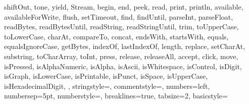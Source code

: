 {{		shiftOut, tone, yield, Stream, begin, end, peek, read, print, 
		println, available, availableForWrite, flush, setTimeout, find, 
		findUntil, parseInt, parseFloat, readBytes, readBytesUntil, readString, 
		readStringUntil, trim, toUpperCase, toLowerCase, charAt, compareTo, 
		concat, endsWith, startsWith, equals, equalsIgnoreCase, getBytes, 
		indexOf, lastIndexOf, length, replace, setCharAt, substring, 
		toCharArray, toInt, press, release, releaseAll, accept, click, move, 
		isPressed, isAlphaNumeric, isAlpha, isAscii, isWhitespace, isControl, 
		isDigit, isGraph, isLowerCase, isPrintable, isPunct, isSpace, 
		isUpperCase, isHexadecimalDigit, 
	},      
	stringstyle=\color{arduinoDarkBlue},    
	commentstyle=\color{arduinoGrey},    
	numbers=left,                    
	numbersep=5pt,                   
	numberstyle=\color{arduinoGrey},    
	breaklines=true,                    %
	tabsize=2,         
	basicstyle=\ttfamily  
}